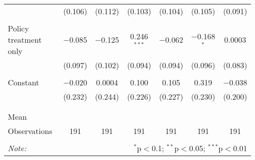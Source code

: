 \begin{tabular}{@{\extracolsep{5pt}}lcccccc}
  & (0.106) & (0.112) & (0.103) & (0.104) & (0.105) & (0.091) \\ 
  & & & & & & \\ 
 Policy treatment only & $-$0.085 & $-$0.125 & 0.246$^{***}$ & $-$0.062 & $-$0.168$^{*}$ & 0.0003 \\ 
  & (0.097) & (0.102) & (0.094) & (0.094) & (0.096) & (0.083) \\ 
  & & & & & & \\ 
 Constant & $-$0.020 & 0.0004 & 0.100 & 0.105 & 0.319 & $-$0.038 \\ 
  & (0.232) & (0.244) & (0.226) & (0.227) & (0.230) & (0.200) \\ 
  & & & & & & \\ 
\hline \\[-1.8ex] 
Mean &  &  &  &  &  &  \\ 
Observations & 191 & 191 & 191 & 191 & 191 & 191 \\ 
\hline 
\hline \\[-1.8ex] 
\textit{Note:}  & \multicolumn{6}{r}{$^{*}$p$<$0.1; $^{**}$p$<$0.05; $^{***}$p$<$0.01} \\ 
\end{tabular} 
